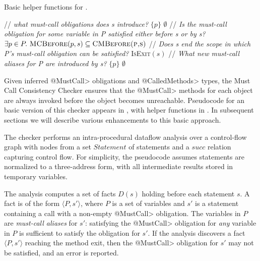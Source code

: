 \begin{algorithm}
  \caption{Basic helper functions for .}
  \label{alg:helpers}
  \begin{algorithmic}[1]
  \State // \textit{what must-call obligations does s introduce?}
    \State \Return $\{ p \}$
  \Else
    \State \Return $\emptyset$
  \EndIf
  \EndProcedure
  \State // \textit{Is the must-call obligation for some variable in P satisfied either before s or by s?}
  \State \Return $\exists p \in P .\ \textsc{MCBefore}(p,s) \subseteq \textsc{CMBefore(p,s)}$
  \EndProcedure
  \State // \textit{Does s end the scope in which P's must-call obligation can
  be satisfied?}
  \State \Return \textsc{IsExit}$(s)$
  \EndProcedure
  \State // \textit{What new must-call aliases for P are introduced by s?}
    \State \Return $\{ p \}$
  \Else
    \State \Return $\emptyset$
  \EndIf
  \EndProcedure
  \end{algorithmic}

\end{algorithm}

Given inferred \<@MustCall> obligations and \<@CalledMethods> types, the Must
Call Consistency Checker ensures that the \<@MustCall> methods for each object
are always invoked before the object becomes unreachable.  Pseudocode for an
basic version of this checker appears in , with
helper functions in .  In subsequent sections we will describe
various enhancements to this basic approach.

The checker performs an intra-procedural dataflow analysis over a control-flow
graph with nodes from a set $\mathit{Statement}$ of statements and a
$\mathit{succ}$ relation capturing control flow.  For simplicity, the pseudocode
assumes statements are normalized to a three-address form, with all intermediate
results stored in temporary variables.  

The analysis computes a set of facts $D(s)$ holding before each statement $s$.
A fact is of the form $\langle P, s' \rangle$, where $P$ is a set of variables
and $s'$ is a statement containing a call with a non-empty \<@MustCall>
obligation. The variables in $P$ are \emph{must-call aliases} for $s'$:
satisfying the \<@MustCall> obligation for \emph{any} variable in $P$ is
sufficient to satisfy the obligation for $s'$.  If the analysis discovers a fact
$\langle P, s' \rangle$ reaching the method exit, then the \<@MustCall>
obligation for $s'$ may not be satisfied, and an error is reported.

